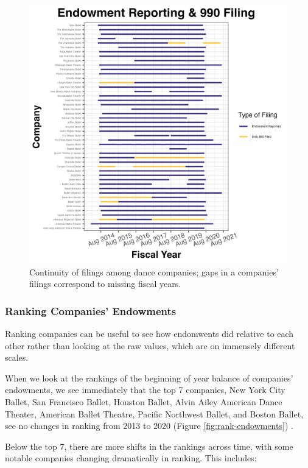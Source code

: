 \documentclass[Dance Data
Project,article,submit,moreauthors,pdftex]{mdpi}
\begin{document}
\begin{figure}[H]
\includegraphics[width=0.9\linewidth,]{../images/gap_plot_endowment} \caption{\label{fig:gap-plot}Continuity of filings among dance companies; gaps in a companies' filings correspond to missing fiscal years.}\label{fig:unnamed-chunk-2}
\end{figure}

\hypertarget{ranking-companies-endowments}{%
\subsubsection{Ranking Companies'
Endowments}\label{ranking-companies-endowments}}

Ranking companies can be useful to see how endomwents did relative to
each other rather than looking at the raw values, which are on immensely
different scales.

When we look at the rankings of the beginning of year balance of
companies' endowments, we see immediately that the top 7 companies, New
York City Ballet, San Francisco Ballet, Houston Ballet, Alvin Ailey
American Dance Theater, American Ballet Theatre, Pacific Northwest
Ballet, and Boston Ballet, see no changes in ranking from 2013 to 2020
(Figure \ref{fig:rank-endowments}) .

Below the top 7, there are more shifts in the rankings across time, with
some notable companies changing dramatically in ranking. This includes:
\end{document}
